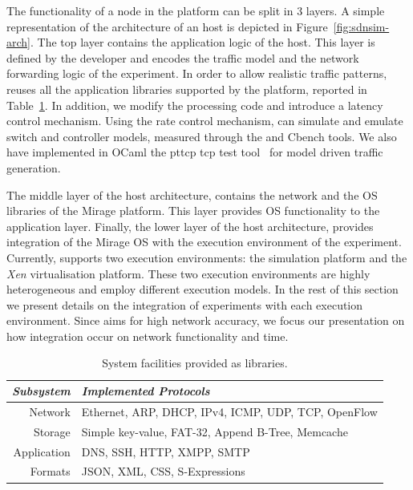 The functionality of a node in the \sdnsim platform can be split in 3 layers.  A
simple representation of the architecture of an \sdnsim host is depicted in
Figure~\ref{fig:sdnsim-arch}.  The top layer contains the application logic of
the host. This layer is defined by the developer and encodes the traffic model
and the network forwarding logic of the experiment. In order to allow realistic
traffic patterns, \sdnsim reuses all the application libraries
supported by the \mirage platform, reported in Table~\ref{t:facilities}. In addition,
we modify the \of processing code and introduce a latency control mechanism. 
Using the rate control mechanism, \sdnsim can simulate and emulate
switch and controller models, measured through the \oflops and Cbench tools.
We also have implemented in OCaml the pttcp tcp test tool~\cite{pttcp} for
model driven traffic generation. 

The middle layer of the host architecture, contains the network and the OS
libraries of the Mirage platform. This layer provides OS functionality to the
application layer. Finally, the lower layer of the host architecture, provides
integration of the Mirage OS with the execution environment of the experiment.
Currently, \sdnsim supports two execution environments: the {\it {}}
\/simulation platform  and the {\it Xen} \/virtualisation platform. These two
execution environments are highly heterogeneous and employ different execution
models.  In the rest of this section we present details on the integration of
\sdnsim experiments with each execution environment.  Since \sdnsim aims for
high network accuracy, we focus our presentation on how integration occur on
network functionality and time.

\begin{table}
\centering
\begin{tabular}{r|p{}}
\emph{Subsystem} & \emph{Implemented Protocols} \\
\hline 
Network     & Ethernet, ARP, DHCP, IPv4, ICMP, UDP, TCP, OpenFlow\\ 
Storage     & Simple key-value, FAT-32, Append B-Tree, Memcache \\
Application & DNS, SSH, HTTP, XMPP, SMTP  \\ 
Formats     & JSON, XML, CSS, S-Expressions\\
\end{tabular}
\caption{\label{t:facilities}System facilities provided as \mirage{}
        libraries.}
\end{table}


